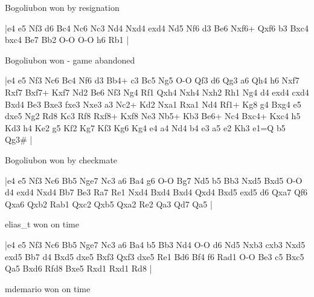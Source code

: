 \showboard

Bogoliubon won by resignation

\makegametitle
|e4 e5 Nf3 d6 Bc4 Nc6 Nc3 Nd4 Nxd4 exd4 Nd5 Nf6 d3 Be6 Nxf6+ Qxf6 b3 Bxc4 bxc4 Be7 Bb2 O-O O-O h6 Rb1  |

\showboard

Bogoliubon won - game abandoned

\makegametitle
|e4 e5 Nf3 Nc6 Bc4 Nf6 d3 Bb4+ c3 Bc5 Ng5 O-O Qf3 d6 Qg3 a6 Qh4 h6 Nxf7 Rxf7 Bxf7+ Kxf7 Nd2 Be6 Nf3 Ng4 Rf1 Qxh4 Nxh4 Nxh2 Rh1 Ng4 d4 exd4 cxd4 Bxd4 Be3 Bxe3 fxe3 Nxe3 a3 Nc2+ Kd2 Nxa1 Rxa1 Nd4 Rf1+ Kg8 g4 Bxg4 e5 dxe5 Ng2 Rd8 Kc3 Rf8 Rxf8+ Kxf8 Ne3 Nb5+ Kb3 Be6+ Nc4 Bxc4+ Kxc4 h5 Kd3 h4 Ke2 g5 Kf2 Kg7 Kf3 Kg6 Kg4 e4 a4 Nd4 b4 e3 a5 e2 Kh3 e1=Q b5 Qg3\#  |

\showboard

Bogoliubon won by checkmate

\makegametitle
|e4 e5 Nf3 Nc6 Bb5 Nge7 Nc3 a6 Ba4 g6 O-O Bg7 Nd5 b5 Bb3 Nxd5 Bxd5 O-O d4 exd4 Nxd4 Bb7 Be3 Ra7 Re1 Nxd4 Bxd4 Bxd4 Qxd4 Bxd5 exd5 d6 Qxa7 Qf6 Qxa6 Qxb2 Rab1 Qxc2 Qxb5 Qxa2 Re2 Qa3 Qd7 Qa5  |

\showboard

elias\_t won on time

\makegametitle
|e4 e5 Nf3 Nc6 Bb5 Nge7 Nc3 a6 Ba4 b5 Bb3 Nd4 O-O d6 Nd5 Nxb3 cxb3 Nxd5 exd5 Bb7 d4 Bxd5 dxe5 Bxf3 Qxf3 dxe5 Re1 Bd6 Bf4 f6 Rad1 O-O Be3 c5 Bxc5 Qa5 Bxd6 Rfd8 Bxe5 Rxd1 Rxd1 Rd8  |

\showboard

mdemario won on time

